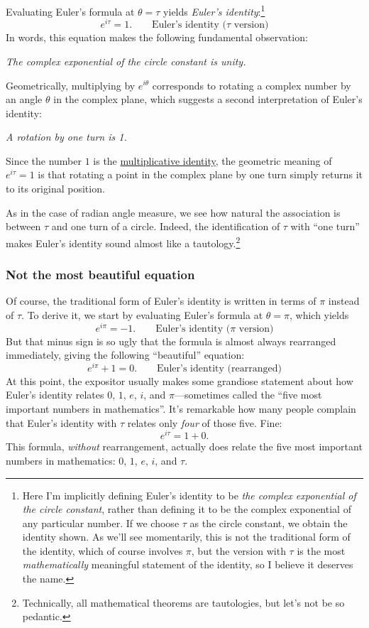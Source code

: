 Evaluating Euler's formula at $\theta = \tau$ yields \emph{Euler's identity}:\footnote{Here I'm implicitly defining Euler's identity to be \emph{the complex exponential of the circle constant}, rather than defining it to be the complex exponential of any particular number. If we choose $\tau$ as the circle constant, we obtain the identity shown. As we'll see momentarily, this is not the traditional form of the identity, which of course involves $\pi$, but the version with $\tau$ is the most \emph{mathematically} meaningful statement of the identity, so I believe it deserves the name.}
\[ e^{i\tau} = 1. \qquad\mbox{Euler's identity ($\tau$ version)} \]
In words, this equation makes the following fundamental observation:

\begin{center}
\emph{The complex exponential of the circle constant is unity.}
\end{center}

Geometrically, multiplying by $e^{i\theta}$ corresponds to rotating a complex number by an angle $\theta$ in the complex plane, which suggests a second interpretation of Euler's identity:

\begin{center}
\emph{A rotation by one turn is 1.}
\end{center}

\noindent Since the number $1$ is the \href{http://en.wikipedia.org/wiki/Identity_element}{multiplicative identity}, the geometric meaning of $e^{i\tau} = 1$ is that rotating a point in the complex plane by one turn simply returns it to its original position.

As in the case of radian angle measure, we see how natural the association is between $\tau$ and one turn of a circle. Indeed, the identification of $\tau$ with ``one turn'' makes Euler's identity sound almost like a tautology.\footnote{Technically, all mathematical theorems are tautologies, but let's not be so pedantic.}

    \subsubsection{Not the most beautiful equation} %
    \label{sec:not_the_most_beautiful_equation}

Of course, the traditional form of Euler's identity is written in terms of $\pi$ instead of $\tau$. To derive it, we start by evaluating Euler's formula at $\theta = \pi$, which yields
\[ e^{i\pi} = -1. \qquad\mbox{Euler's identity ($\pi$ version)} \]
But that minus sign is so ugly that the formula is almost always rearranged immediately, giving the following ``beautiful'' equation:
\[ e^{i\pi} + 1 = 0. \qquad\mbox{Euler's identity (rearranged)} \]
At this point, the expositor usually makes some grandiose statement about how Euler's identity relates $0$, $1$, $e$, $i$, and $\pi$---sometimes called the ``five most important numbers in mathematics''. It's remarkable how many people complain that Euler's identity with $\tau$ relates only \emph{four} of those five. Fine:
\[ e^{i\tau} = 1 + 0. \]
This formula, \emph{without} rearrangement, actually does relate the five most important numbers in mathematics: $0$, $1$, $e$, $i$, and $\tau$.

